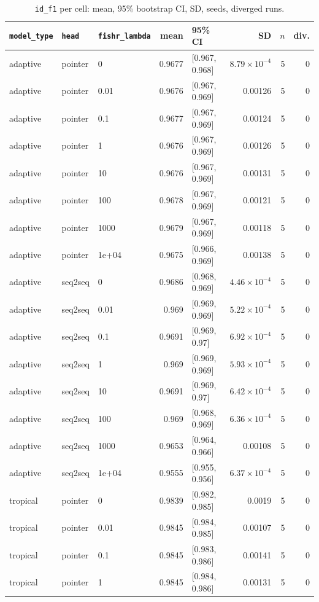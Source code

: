 \documentclass[10pt]{article}
\begin{document}
{\small
\begin{longtable}{lllrlrrr}
\caption{\texttt{id\_f1} per cell: mean, 95\% bootstrap CI, SD, seeds, diverged runs.}\label{tab:summary-id_f1}\\
\toprule
\texttt{model\_type} & \texttt{head} & \texttt{fishr\_lambda} & mean & 95\% CI & SD & $n$ & div.\\
\midrule
\endhead
adaptive & pointer & 0 & 0.9677 & [0.967, 0.968] & $8.79\times10^{-4}$ & 5 & 0\\
adaptive & pointer & 0.01 & 0.9676 & [0.967, 0.969] & 0.00126 & 5 & 0\\
adaptive & pointer & 0.1 & 0.9677 & [0.967, 0.969] & 0.00124 & 5 & 0\\
adaptive & pointer & 1 & 0.9676 & [0.967, 0.969] & 0.00126 & 5 & 0\\
adaptive & pointer & 10 & 0.9676 & [0.967, 0.969] & 0.00131 & 5 & 0\\
adaptive & pointer & 100 & 0.9678 & [0.967, 0.969] & 0.00121 & 5 & 0\\
adaptive & pointer & 1000 & 0.9679 & [0.967, 0.969] & 0.00118 & 5 & 0\\
adaptive & pointer & 1e+04 & 0.9675 & [0.966, 0.969] & 0.00138 & 5 & 0\\
adaptive & seq2seq & 0 & 0.9686 & [0.968, 0.969] & $4.46\times10^{-4}$ & 5 & 0\\
adaptive & seq2seq & 0.01 & 0.969 & [0.969, 0.969] & $5.22\times10^{-4}$ & 5 & 0\\
adaptive & seq2seq & 0.1 & 0.9691 & [0.969, 0.97] & $6.92\times10^{-4}$ & 5 & 0\\
adaptive & seq2seq & 1 & 0.969 & [0.969, 0.969] & $5.93\times10^{-4}$ & 5 & 0\\
adaptive & seq2seq & 10 & 0.9691 & [0.969, 0.97] & $6.42\times10^{-4}$ & 5 & 0\\
adaptive & seq2seq & 100 & 0.969 & [0.968, 0.969] & $6.36\times10^{-4}$ & 5 & 0\\
adaptive & seq2seq & 1000 & 0.9653 & [0.964, 0.966] & 0.00108 & 5 & 0\\
adaptive & seq2seq & 1e+04 & 0.9555 & [0.955, 0.956] & $6.37\times10^{-4}$ & 5 & 0\\
tropical & pointer & 0 & 0.9839 & [0.982, 0.985] & 0.0019 & 5 & 0\\
tropical & pointer & 0.01 & 0.9845 & [0.984, 0.985] & 0.00107 & 5 & 0\\
tropical & pointer & 0.1 & 0.9845 & [0.983, 0.986] & 0.00141 & 5 & 0\\
tropical & pointer & 1 & 0.9845 & [0.984, 0.986] & 0.00131 & 5 & 0\\

\end{longtable}}
\end{document}
